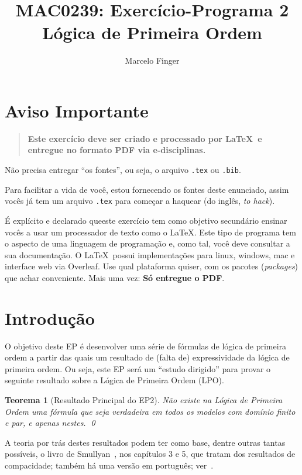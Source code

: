 \documentclass[a4paper, 11pt]{article}
\title{MAC0239: Exercício-Programa 2 \\ {\small Lógica de Primeira Ordem}}
\author{Marcelo Finger}
\date{\the\year}
\newtheorem{teorema}[exemplo]{Teorema}
\begin{document}
    \maketitle

\section*{Aviso Importante}

\begin{quote}\bf\Large
  Este  exercício deve  ser  criado e  processado por  \LaTeX\  e entregue  no   formato PDF via e-disciplinas.
\end{quote}

Não precisa entregar ``os fontes'', ou seja, o arquivo \texttt{.tex} ou \texttt{.bib}.

Para facilitar  a vida de  você, estou  fornecendo os fontes  deste enunciado,
assim vocês já  tem um arquivo \texttt{.tex} para começar  a haquear (do inglês, \emph{to
  hack}).

É explícito e declarado queeste exercício tem como objetivo secundário ensinar vocês a usar um processador de texto como o \LaTeX.   Este tipo de programa tem o aspecto de uma linguagem de programação e, como tal, você deve consultar a sua documentação.  O \LaTeX\ possui implementações para linux, windows, mac e interface web via Overleaf.  Use qual plataforma quiser, com os pacotes (\emph{packages}) que achar conveniente.  Mais uma vez: \textbf{Só entregue o PDF}.

\section{Introdução}

O objetivo deste EP é desenvolver uma  série de fórmulas de lógica de primeira ordem a partir  das quais um resultado de (falta  de) expressividade da lógica de primeira ordem.  Ou seja, este EP será um ``estudo dirigido'' para provar o seguinte resultado sobre a Lógica de Primeira Ordem (LPO).

\begin{teorema}[Resultado Principal do EP2] \label{teo:princ}
  Não existe  na Lógica de Primeira  Ordem uma fórmula que  seja verdadeira em   todos os modelos com domínio finito e par, e apenas nestes. \qed  
\end{teorema}

A teoria por trás destes resultados podem ter como base, dentre outras tantas possíveis, o livro de Smullyan~\cite{smullyan1995}, nos capítulos 3 e 5, que tratam dos resultados de compacidade; também há uma versão em português; ver~\cite{Smu2009}.
\end{document}

